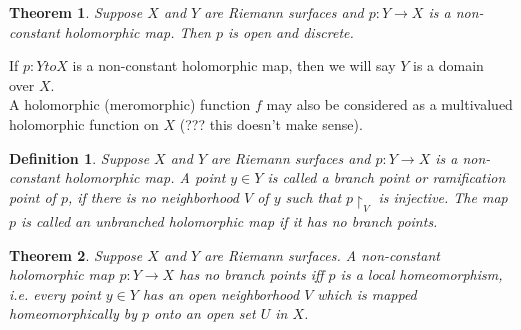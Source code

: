 \documentclass{article}
\newtheorem{thm}{Theorem}
\newtheorem{defn}{Definition}
\begin{document}
\begin{thm}

Suppose $X$ and $Y$ are Riemann surfaces and $p:Y \to X$ is a non-constant holomorphic map. Then $p$ is open and discrete.

\end{thm}

If $p:Y to X$ is a non-constant holomorphic map, then we will say $Y$ is a domain over $X$.\\
\indent A holomorphic (meromorphic) function $f$ may also be considered as a multivalued holomorphic function on $X$ (??? this doesn't make sense).

\begin{defn}

Suppose $X$ and $Y$ are Riemann surfaces and $p: Y \to X$ is a non-constant holomorphic map. A point $y \in Y$ is called a \textit{branch point} or \textit{ramification point} of $p$, if there is no neighborhood $V$ of $y$ such that $p \restriction_V$ is injective. The map $p$ is called an \textit{unbranched holomorphic map} if it has no branch points.
\end{defn}

\begin{thm}

Suppose $X$ and $Y$ are Riemann surfaces. A non-constant holomorphic map $p: Y \to X$ has no branch points iff $p$ is a local homeomorphism, i.e. every point $y \in Y$ has an open neighborhood $V$ which is mapped homeomorphically by $p$ onto an open set $U$ in $X$.

\end{thm}
\end{document}
